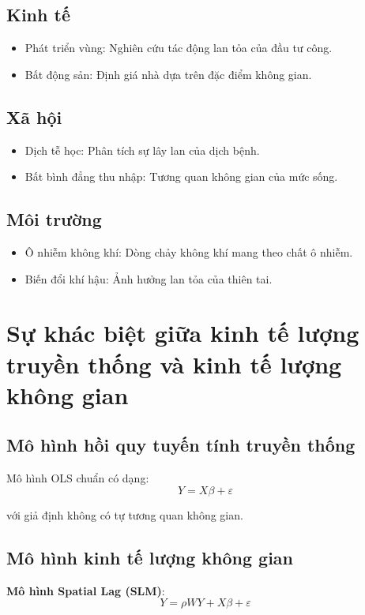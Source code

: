 \subsection{Kinh tế}
\begin{itemize}
    \item Phát triển vùng: Nghiên cứu tác động lan tỏa của đầu tư công.
    \item Bất động sản: Định giá nhà dựa trên đặc điểm không gian.
\end{itemize}

\subsection{Xã hội}
\begin{itemize}
    \item Dịch tễ học: Phân tích sự lây lan của dịch bệnh.
    \item Bất bình đẳng thu nhập: Tương quan không gian của mức sống.
\end{itemize}

\subsection{Môi trường}
\begin{itemize}
    \item Ô nhiễm không khí: Dòng chảy không khí mang theo chất ô nhiễm.
    \item Biến đổi khí hậu: Ảnh hưởng lan tỏa của thiên tai.
\end{itemize}

\section{Sự khác biệt giữa kinh tế lượng truyền thống và kinh tế lượng không gian}
\subsection{Mô hình hồi quy tuyến tính truyền thống}
Mô hình OLS chuẩn có dạng:
\begin{equation}
    Y = X\beta + \varepsilon
\end{equation}

với giả định không có tự tương quan không gian.

\subsection{Mô hình kinh tế lượng không gian}
\textbf{Mô hình Spatial Lag (SLM)}:
\begin{equation}
    Y = \rho W Y + X \beta + \varepsilon
\end{equation}

